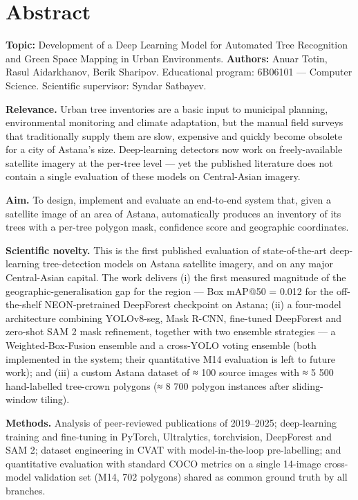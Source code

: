 \chapter{Abstract}\label{abstract}

\textbf{Topic:} Development of a Deep Learning Model for Automated Tree Recognition and Green Space Mapping in Urban Environments. \textbf{Authors:} Anuar Totin, Rasul Aidarkhanov, Berik Sharipov. Educational program: 6B06101 --- Computer Science. Scientific supervisor: Syndar Satbayev.

\textbf{Relevance.} Urban tree inventories are a basic input to municipal planning, environmental monitoring and climate adaptation, but the manual field surveys that traditionally supply them are slow, expensive and quickly become obsolete for a city of Astana's size. Deep-learning detectors now work on freely-available satellite imagery at the per-tree level --- yet the published literature does not contain a single evaluation of these models on Central-Asian imagery.

\textbf{Aim.} To design, implement and evaluate an end-to-end system that, given a satellite image of an area of Astana, automatically produces an inventory of its trees with a per-tree polygon mask, confidence score and geographic coordinates.

\textbf{Scientific novelty.} This is the first published evaluation of state-of-the-art deep-learning tree-detection models on Astana satellite imagery, and on any major Central-Asian capital. The work delivers (i) the first measured magnitude of the geographic-generalisation gap for the region --- Box mAP@50 = 0.012 for the off-the-shelf NEON-pretrained DeepForest checkpoint on Astana; (ii) a four-model architecture combining YOLOv8-seg, Mask R-CNN, fine-tuned DeepForest and zero-shot SAM 2 mask refinement, together with two ensemble strategies --- a Weighted-Box-Fusion ensemble and a cross-YOLO voting ensemble (both implemented in the system; their quantitative M14 evaluation is left to future work); and (iii) a custom Astana dataset of ≈ 100 source images with ≈ 5 500 hand-labelled tree-crown polygons (≈ 8 700 polygon instances after sliding-window tiling).

\textbf{Methods.} Analysis of peer-reviewed publications of 2019--2025; deep-learning training and fine-tuning in PyTorch, Ultralytics, torchvision, DeepForest and SAM 2; dataset engineering in CVAT with model-in-the-loop pre-labelling; and quantitative evaluation with standard COCO metrics on a single 14-image cross-model validation set (M14, 702 polygons) shared as common ground truth by all branches.

